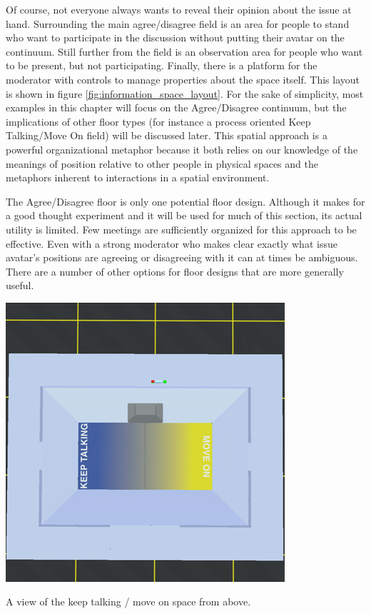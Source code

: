 Of course, not everyone always wants to reveal their opinion about the issue at hand. Surrounding the main agree/disagree field is an area for people to stand who want to participate in the discussion without putting their avatar on the continuum. Still further from the field is an observation area for people who want to be present, but not participating. Finally, there is a platform for the moderator with controls to manage properties about the space itself. This layout is shown in figure \ref{fig:information_space_layout}. For the sake of simplicity, most examples in this chapter will focus on the Agree/Disagree continuum, but the implications of other floor types (for instance a process oriented Keep Talking/Move On field) will be discussed later. This spatial approach is a powerful organizational metaphor because it both relies on our knowledge of the meanings of position relative to other people in physical spaces \citep{Yee:2007cl} and the metaphors inherent to interactions in a spatial environment. \citep{lakoff_metaphors_1980}

The Agree/Disagree floor is only one potential floor design. Although it makes for a good thought experiment and it will be used for much of this section, its actual utility is limited. Few meetings are sufficiently organized for this approach to be effective. Even with a strong moderator who makes clear exactly what issue avatar's positions are agreeing or disagreeing with it can at times be ambiguous. There are a number of other options for floor designs that are more generally useful.

\begin{marginfigure}
	\includegraphics{figures/keep_talking_from_above.png}
	\caption{A view of the keep talking / move on space from above.}
	\label{fig:keep_talking_floor}
\end{marginfigure}

